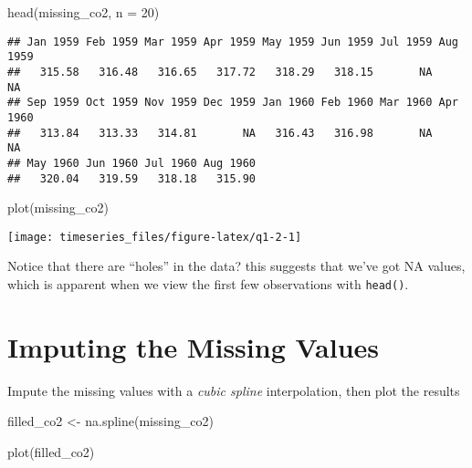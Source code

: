 \documentclass[
]{book}
\newenvironment{Shaded}{\begin{snugshade}}{\end{snugshade}}
\newcommand{\AttributeTok}[1]{\textcolor[rgb]{0.77,0.63,0.00}{#1}}
\newcommand{\DecValTok}[1]{\textcolor[rgb]{0.00,0.00,0.81}{#1}}
\newcommand{\FunctionTok}[1]{\textcolor[rgb]{0.00,0.00,0.00}{#1}}
\newcommand{\NormalTok}[1]{#1}
\newcommand{\OtherTok}[1]{\textcolor[rgb]{0.56,0.35,0.01}{#1}}
\begin{document}
\begin{Shaded}
\begin{Highlighting}[]
\FunctionTok{head}\NormalTok{(missing\_co2, }\AttributeTok{n =} \DecValTok{20}\NormalTok{)}
\end{Highlighting}
\end{Shaded}

\begin{verbatim}
## Jan 1959 Feb 1959 Mar 1959 Apr 1959 May 1959 Jun 1959 Jul 1959 Aug 1959 
##   315.58   316.48   316.65   317.72   318.29   318.15       NA       NA 
## Sep 1959 Oct 1959 Nov 1959 Dec 1959 Jan 1960 Feb 1960 Mar 1960 Apr 1960 
##   313.84   313.33   314.81       NA   316.43   316.98       NA       NA 
## May 1960 Jun 1960 Jul 1960 Aug 1960 
##   320.04   319.59   318.18   315.90
\end{verbatim}

\begin{Shaded}
\begin{Highlighting}[]
\FunctionTok{plot}\NormalTok{(missing\_co2)}
\end{Highlighting}
\end{Shaded}

\begin{center}\texttt{[image: timeseries\_files/figure-latex/q1-2-1]} \end{center}

Notice that there are ``holes'' in the data? this suggests that we've got NA values, which is apparent when we view the first few observations with \texttt{head()}.

\newpage

\hypertarget{imputing-the-missing-values}{%
\section{Imputing the Missing Values}\label{imputing-the-missing-values}}

Impute the missing values with a \emph{cubic spline} interpolation, then plot the results

\begin{Shaded}
\begin{Highlighting}[]
\NormalTok{filled\_co2 }\OtherTok{\textless{}{-}} \FunctionTok{na.spline}\NormalTok{(missing\_co2)}
\end{Highlighting}
\end{Shaded}

\begin{Shaded}
\begin{Highlighting}[]
\FunctionTok{plot}\NormalTok{(filled\_co2)}
\end{Highlighting}
\end{Shaded}
\end{document}
